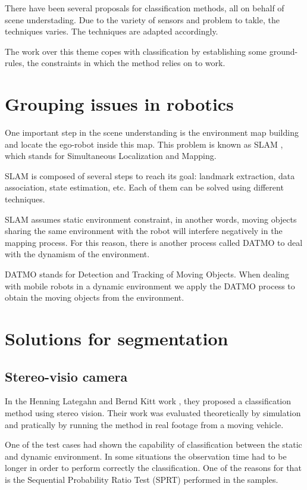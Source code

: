 
There have been several proposals for classification methods, all on behalf of scene understading. Due to the variety of sensors and problem to takle, the techniques varies. The techniques are adapted accordingly.

The work over this theme copes with classification by establishing some ground-rules, the constraints in which the method relies on to work.

\section{Grouping issues in robotics}

One important step in the scene understanding is the environment map building and locate the ego-robot inside this map. This problem is known as SLAM \cite{Leonard2002Mobile}, which stands for Simultaneous Localization and  Mapping.

SLAM is composed of several steps to reach its goal: landmark extraction, data association, state estimation, etc. Each of them can be solved using different techniques.

SLAM assumes static environment constraint, in another words, moving objects sharing the same environment with the robot will interfere negatively in the mapping process. For this reason, there is another process called DATMO to deal with the dynamism of the environment.

DATMO stands for Detection and Tracking of Moving Objects. When dealing with mobile robots in a dynamic environment we apply the DATMO process to obtain the moving objects from the environment.

\section{Solutions for segmentation}

\subsection{Stereo-visio camera}

In the Henning Lategahn and Bernd Kitt work \cite{DBLP:conf/ivs/LategahnGHKE11}, they proposed a classification method using stereo vision. Their work was evaluated theoretically by simulation and pratically by running the method in real footage from a moving vehicle.

One of the test cases had shown the capability of classification between the static and dynamic environment. In some situations the observation time had to be longer in order to perform correctly the classification. One of the reasons for that is the Sequential Probability Ratio Test (SPRT) performed in the samples.


